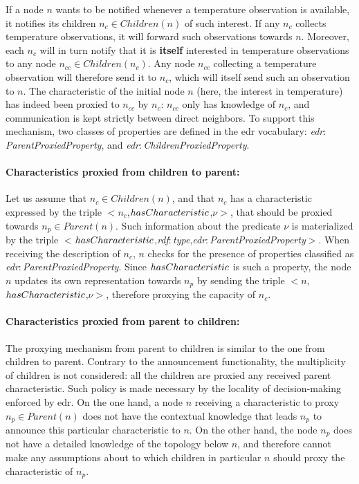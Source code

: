 \documentclass[sw]{iosart2x}
\newcommand{\namespace}[1]{\textit{#1$:$}}
\newcommand{\concept}[2]{\namespace{#1}\-\textit{#2}}
\newcommand{\triplet}[3]{$<$#1,\textit{#2},#3$>$}
\begin{document}
If a node $n$ wants to be notified whenever a temperature observation is available, it notifies its children $n_{c}\in Children(n)$ of such interest. 
If any $n_{c}$ collects temperature observations, it will forward such observations towards $n$. 
Moreover, each $n_{c}$ will in turn notify that it is \textbf{itself} interested in temperature observations to any node $n_{cc}\in Children(n_c)$.
Any node $n_{cc}$ collecting a temperature observation will therefore send it to $n_{c}$, which will itself send such an observation to $n$.
The characteristic of the initial node $n$ (here, the interest in temperature) has indeed been proxied to $n_{cc}$ by $n_{c}$: $n_{cc}$ only has knowledge of $n_{c}$, and communication is kept strictly between direct neighbors.
To support this mechanism, two classes of properties are defined in the \gls{edr} vocabulary: \concept{edr}{Parent\-Proxied\-Property}, and \concept{edr}{Children\-Proxied\-Property}.

\paragraph{Characteristics proxied from children to parent:}
Let us assume that $n_{c}\in Children(n)$, and that $n_{c}$ has a characteristic expressed by the triple \triplet{$n_{c}$}{$has\-Cha\-racteri\-stic$}{$\nu$}, that should be proxied towards $n_{p}\in Parent(n)$.
Such information about the predicate $\nu$ is materialized by the triple \triplet{$has\-Characteri\-stic$}{\concept{rdf}{type}}{\concept{edr}{Parent\-Proxied\-Property}}.
When receiving the description of $n_{c}$, $n$ checks for the presence of properties classified as \concept{edr}{Parent\-Proxied\-Property}. 
Since $has\-Characteristic$ is such a property, the node $n$ updates its own representation towards $n_p$ by sending the triple \triplet{$n$}{$has\-Characteri\-stic$}{$\nu$}, therefore proxying the capacity of $n_{c}$.

\paragraph{Characteristics proxied from parent to children:}
The proxying mechanism from parent to children is similar to the one from children to parent.
Contrary to the announcement functionality, the multiplicity of children is not considered: all the children are proxied any received parent characteristic.
Such policy is made necessary by the locality of decision-making enforced by \gls{edr}. 
On the one hand, a node $n$ receiving a characteristic to proxy $n_{p}\in Parent(n)$ does not have the contextual knowledge that leads $n_{p}$ to announce this particular characteristic to $n$.
On the other hand, the node $n_{p}$ does not have a detailed knowledge of the topology below $n$, and therefore cannot make any assumptions about to which children in particular $n$ should proxy the characteristic of $n_{p}$.
\end{document}
